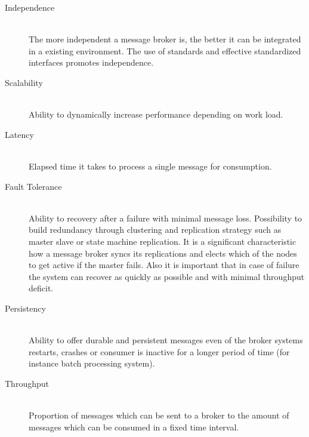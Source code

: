 \begin{description}
    \item [Independence] \hfill \\
    { The more independent a
        message broker is, the better it can be integrated in a existing
        environment. The use of standards and effective standardized interfaces
        promotes independence.}
    \item [Scalability] \hfill \\
    {Ability to dynamically increase performance depending on work load.  }
    \item [Latency]\hfill \\
    {Elapsed time it takes to process a single message for consumption.  }
\item [Fault Tolerance] \hfill \\
        {Ability to recovery after a failure with minimal message loss.
            Possibility to build redundancy through clustering  and
            replication strategy such as master slave  or state machine
            replication. It is a significant characteristic how a
            message broker syncs its replications and elects which of the nodes
            to get active if the master fails. Also it is important that in case
            of failure the system can recover as quickly as possible and with
            minimal throughput deficit.   }
        \item [Persistency] \hfill \\ 
        {Ability to offer durable and persistent messages even of the broker
            systems restarts, crashes or consumer is inactive for a longer period of time
            (for instance batch processing system). }
    \item [Throughput] \hfill \\
        {Proportion of messages which can be sent to a broker to the amount of
        messages which can be consumed in a fixed time interval.}
\end{description}


